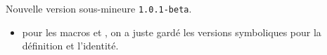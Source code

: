 Nouvelle version sous-mineure \verb+1.0.1-beta+.

\begin{itemize}[itemsep=.5em]
    \item {}
          pour les macros  et , on a juste gardé les versions symboliques pour la définition et l'identité.
\end{itemize}


\separation
